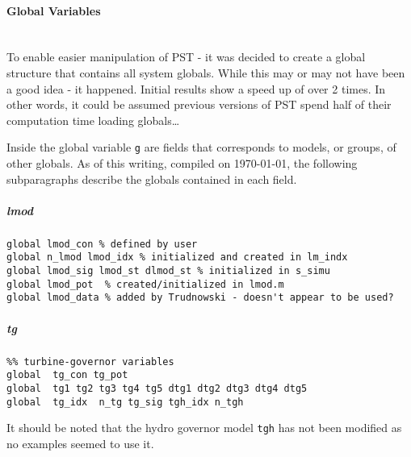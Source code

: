 \documentclass[12pt]{article}
\begin{document}
\pagebreak
\paragraph{Global Variables} \ \\
To enable easier manipulation of PST - it was decided to create a global structure that contains all system globals.
While this may or may not have been a good idea - it happened.
Initial results show a speed up of over 2 times.
In other words, it could be assumed previous versions of PST spend half of their computation time loading globals\ldots


Inside the global variable \verb|g| are fields that corresponds to models, or groups, of other globals.
As of this writing, compiled on \today, the following subparagraphs describe the globals contained in each field. 

\subparagraph{lmod}
\begin{verbatim}
global lmod_con % defined by user
global n_lmod lmod_idx % initialized and created in lm_indx
global lmod_sig lmod_st dlmod_st % initialized in s_simu
global lmod_pot  % created/initialized in lmod.m 
global lmod_data % added by Trudnowski - doesn't appear to be used?
\end{verbatim}

\subparagraph{tg}
\begin{verbatim}
%% turbine-governor variables
global  tg_con tg_pot
global  tg1 tg2 tg3 tg4 tg5 dtg1 dtg2 dtg3 dtg4 dtg5
global  tg_idx  n_tg tg_sig tgh_idx n_tgh
\end{verbatim}
It should be noted that the hydro governor model \verb|tgh| has not been modified as no examples seemed to use it.
\end{document}
